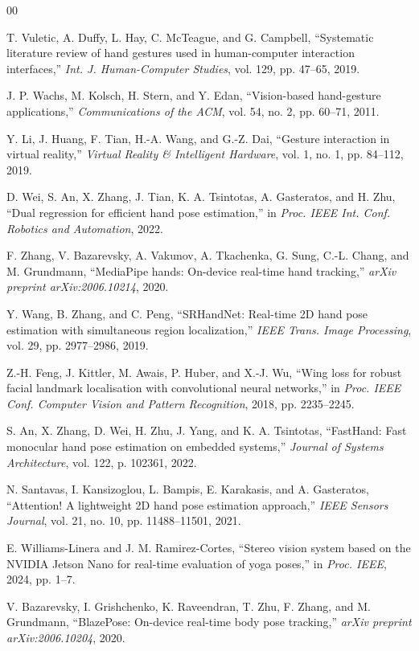 \documentclass[10pt,letterpaper,twocolumn]{article}
\begin{document}
\clearpage
\onecolumn
\begin{thebibliography}{00}

T. Vuletic, A. Duffy, L. Hay, C. McTeague, and G. Campbell, ``Systematic literature review of hand gestures used in human-computer interaction interfaces,'' \emph{Int. J. Human-Computer Studies}, vol. 129, pp. 47--65, 2019.

J. P. Wachs, M. Kolsch, H. Stern, and Y. Edan, ``Vision-based hand-gesture applications,'' \emph{Communications of the ACM}, vol. 54, no. 2, pp. 60--71, 2011.

Y. Li, J. Huang, F. Tian, H.-A. Wang, and G.-Z. Dai, ``Gesture interaction in virtual reality,'' \emph{Virtual Reality \& Intelligent Hardware}, vol. 1, no. 1, pp. 84--112, 2019.

D. Wei, S. An, X. Zhang, J. Tian, K. A. Tsintotas, A. Gasteratos, and H. Zhu, ``Dual regression for efficient hand pose estimation,'' in \emph{Proc. IEEE Int. Conf. Robotics and Automation}, 2022.

F. Zhang, V. Bazarevsky, A. Vakunov, A. Tkachenka, G. Sung, C.-L. Chang, and M. Grundmann, ``MediaPipe hands: On-device real-time hand tracking,'' \emph{arXiv preprint arXiv:2006.10214}, 2020.

Y. Wang, B. Zhang, and C. Peng, ``SRHandNet: Real-time 2D hand pose estimation with simultaneous region localization,'' \emph{IEEE Trans. Image Processing}, vol. 29, pp. 2977--2986, 2019.

Z.-H. Feng, J. Kittler, M. Awais, P. Huber, and X.-J. Wu, ``Wing loss for robust facial landmark localisation with convolutional neural networks,'' in \emph{Proc. IEEE Conf. Computer Vision and Pattern Recognition}, 2018, pp. 2235--2245.

S. An, X. Zhang, D. Wei, H. Zhu, J. Yang, and K. A. Tsintotas, ``FastHand: Fast monocular hand pose estimation on embedded systems,'' \emph{Journal of Systems Architecture}, vol. 122, p. 102361, 2022.

N. Santavas, I. Kansizoglou, L. Bampis, E. Karakasis, and A. Gasteratos, ``Attention! A lightweight 2D hand pose estimation approach,'' \emph{IEEE Sensors Journal}, vol. 21, no. 10, pp. 11488--11501, 2021.

E. Williams-Linera and J. M. Ramirez-Cortes, ``Stereo vision system based on the NVIDIA Jetson Nano for real-time evaluation of yoga poses,'' in \emph{Proc. IEEE}, 2024, pp. 1--7.

V. Bazarevsky, I. Grishchenko, K. Raveendran, T. Zhu, F. Zhang, and M. Grundmann, ``BlazePose: On-device real-time body pose tracking,'' \emph{arXiv preprint arXiv:2006.10204}, 2020.


\end{thebibliography}
\end{document}
